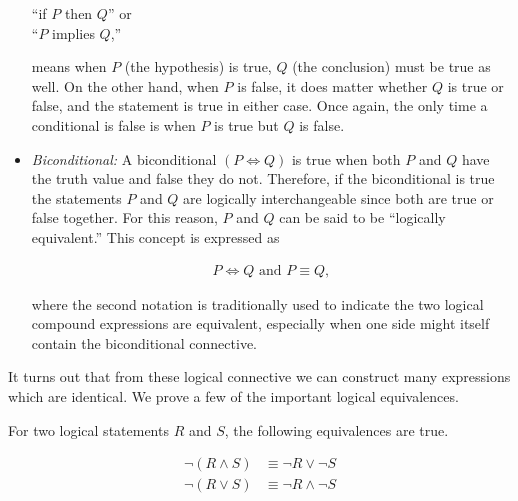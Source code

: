 \documentclass[twoside]{report}
\begin{document}
\begin{itemize}
	\vspace{\baselineskip}
	\begin{center}
			``if $P$ then $Q$'' or \\
			``$P$ implies $Q$,''
	\end{center}
	\vspace{\baselineskip}
	
	  means when $P$ (the hypothesis) is true, $Q$ (the conclusion) must be true as well. On the other hand, when $P$ is false, it does matter whether $Q$ is true or false, and the statement is true in either case. Once again, the only time a conditional is false is when $P$ is true but $Q$ is false.
	  
	  \item \emph{Biconditional:} A biconditional $(P \iff Q)$ is true when both $P$ and $Q$ have the truth value and false they do not. Therefore, if the biconditional is true the statements $P$ and $Q$ are logically interchangeable since both are true or false together. For this reason, $P$ and $Q$ can be said to be ``logically equivalent.'' This concept is expressed as
	  	  
	  \begin{align*}
	  	P \iff Q \text{ and } P \equiv Q,
	  \end{align*}
	  
	  where the second notation is traditionally used to indicate the two logical compound expressions are equivalent, especially when one side might itself contain the biconditional connective.
\end{itemize}

It turns out that from these logical connective we can construct many expressions which are identical. We prove a few of the important logical equivalences. \\

\begin{theorem}
	For two logical statements $R$ and $S$, the following equivalences are true.
	
	\begin{align}
		\neg(R \wedge S) &\equiv \neg R \lor \neg S \\
		\neg(R \lor S) &\equiv \neg R \wedge \neg S
	\end{align}
\end{theorem}
\end{document}
